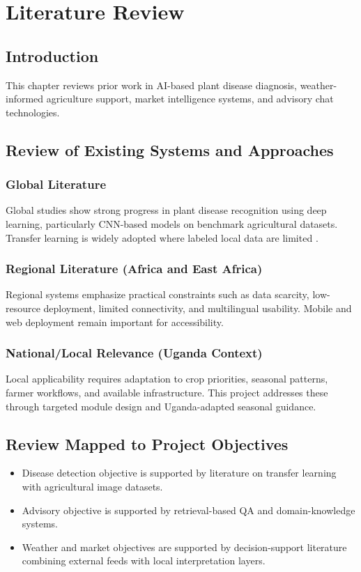 \documentclass[12pt,a4paper]{report}
\begin{document}
\chapter{Literature Review}

\section{Introduction}
This chapter reviews prior work in AI-based plant disease diagnosis, weather-informed agriculture support, market intelligence systems, and advisory chat technologies.

\section{Review of Existing Systems and Approaches}
\subsection{Global Literature}
Global studies show strong progress in plant disease recognition using deep learning, particularly CNN-based models on benchmark agricultural datasets. Transfer learning is widely adopted where labeled local data are limited \cite{plantvillage,mobilenetv2}.

\subsection{Regional Literature (Africa and East Africa)}
Regional systems emphasize practical constraints such as data scarcity, low-resource deployment, limited connectivity, and multilingual usability. Mobile and web deployment remain important for accessibility.

\subsection{National/Local Relevance (Uganda Context)}
Local applicability requires adaptation to crop priorities, seasonal patterns, farmer workflows, and available infrastructure. This project addresses these through targeted module design and Uganda-adapted seasonal guidance.

\section{Review Mapped to Project Objectives}
\begin{itemize}[noitemsep]
    \item Disease detection objective is supported by literature on transfer learning with agricultural image datasets.
    \item Advisory objective is supported by retrieval-based QA and domain-knowledge systems.
    \item Weather and market objectives are supported by decision-support literature combining external feeds with local interpretation layers.
\end{itemize}
\end{document}
